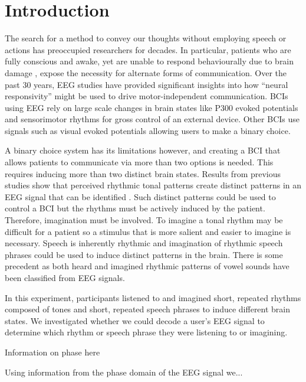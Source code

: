 \section*{Introduction}
The search for a method to convey our thoughts without employing speech or actions has preoccupied researchers for decades.
In particular, patients who are fully conscious and awake, yet are unable to respond behaviourally due to brain damage \cite{owen_2006,monti_2010,cruse_2011}, expose the necessity for alternate forms of communication. 
Over the past 30 years, \ac{EEG} studies have provided significant insights into how ``neural responsivity'' might be used to drive motor-independent communication.
\acp{BCI} using \ac{EEG} rely on large scale changes in brain states like P300 evoked potentials \cite{farwell_1988,mugler_2010,tanaka_2005}  and sensorimotor rhythms \cite{blankertz_2010, pfurtscheller_2001} for gross control of an external device.
Other \acp{BCI} use signals such as visual evoked potentials \cite{miranda_2011, wang_2006} allowing users to make a binary choice. 

A binary choice system has its limitations however, and creating a \ac{BCI} that allows patients to communicate via more than two options is needed.
This requires inducing more than two distinct brain states.
Results from previous studies show that perceived rhythmic tonal patterns create distinct patterns in an EEG signal that can be identified \cite{stober2014}.
Such distinct patterns could be used to control a \ac{BCI} but the rhythms must be actively induced by the patient. 
Therefore, imagination must be involved.
To imagine a tonal rhythm may be difficult for a patient so a stimulus that is more salient and easier to imagine is necessary.
Speech is inherently rhythmic and imagination of rhythmic speech phrases could be used to induce distinct patterns in the brain.
There is some precedent as both heard \cite{Formisano2008} and imagined \cite{Deng2010} rhythmic patterns of vowel sounds have been classified from EEG signals. 

In this experiment, participants listened to and imagined short, repeated rhythms composed of tones and short, repeated speech phrases to induce different brain states.
We investigated whether we could decode a user's \ac{EEG} signal to determine which rhythm or speech phrase they were listening to or imagining.

Information on phase here

Using information from the phase domain of the EEG signal we...